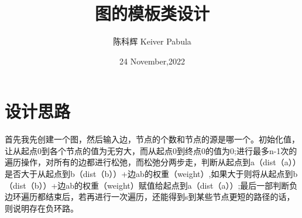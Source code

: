 \documentclass{ctexart}
\title{图的模板类设计}
\author{陈科辉 Keiver Pabula}
\date{24 November,2022}
\begin{document}
\maketitle

\section{设计思路}
首先我先创建一个图，然后输入边，节点的个数和节点的源是哪一个。初始化值，让从起点0到各个节点的值为无穷大，而从起点0到终点0的值为0;进行最多n-1次的遍历操作，对所有的边都进行松弛，而松弛分两步走，判断从起点到a（dist（a））是否大于从起点到b（dist（b））+边ab的权重（weight）,如果大于则将从起点到b（dist（b））+边ab的权重（weight）赋值给起点到a（dist（a））;最后一部判断负边环遍历都结束后，若再进行一次遍历，还能得到s到某些节点更短的路径的话，则说明存在负环路。
\end{document}
